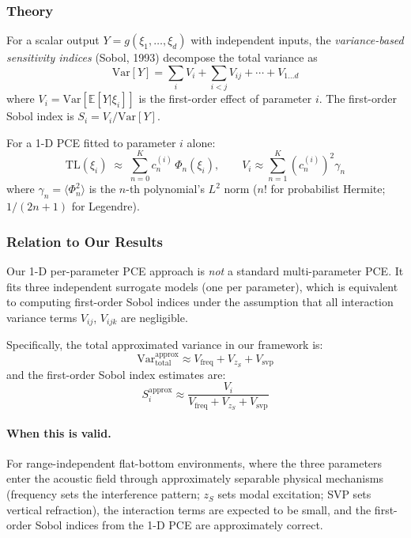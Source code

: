 \documentclass[11pt,a4paper]{article}
\newcommand{\EX}{\mathbb{E}}
\newcommand{\Var}{\mathrm{Var}}
\newcommand{\TL}{\mathrm{TL}}
\begin{document}
\subsubsection{Theory}

For a scalar output $Y = g(\xi_1,\ldots,\xi_d)$ with independent inputs, the
\emph{variance-based sensitivity indices} (Sobol, 1993) decompose the total variance as
\begin{equation}
  \Var[Y] = \sum_i V_i + \sum_{i<j} V_{ij} + \cdots + V_{1\ldots d}
\end{equation}
where $V_i = \Var[\EX[Y|\xi_i]]$ is the first-order effect of parameter $i$.
The first-order Sobol index is $S_i = V_i / \Var[Y]$.

For a 1-D PCE fitted to parameter $i$ alone:
\begin{equation}
  \TL(\xi_i) \;\approx\; \sum_{n=0}^K c_n^{(i)}\,\Phi_n(\xi_i),
  \qquad
  V_i \approx \sum_{n=1}^K \left(c_n^{(i)}\right)^2 \gamma_n
\end{equation}
where $\gamma_n = \langle\Phi_n^2\rangle$ is the $n$-th polynomial's $L^2$ norm
($n!$ for probabilist Hermite; $1/(2n+1)$ for Legendre).

\subsubsection{Relation to Our Results}

Our 1-D per-parameter PCE approach is \emph{not} a standard multi-parameter PCE.
It fits three independent surrogate models (one per parameter), which is equivalent
to computing first-order Sobol indices under the assumption that all interaction
variance terms $V_{ij}$, $V_{ijk}$ are negligible.

Specifically, the total approximated variance in our framework is:
\begin{equation}
  \Var_\text{total}^\text{approx} \approx V_\text{freq} + V_{z_S} + V_\text{svp}
\end{equation}
and the first-order Sobol index estimates are:
\begin{equation}
  S_i^\text{approx} \approx \frac{V_i}{V_\text{freq} + V_{z_S} + V_\text{svp}}
\end{equation}

\paragraph{When this is valid.}
For range-independent flat-bottom environments, where the three parameters enter
the acoustic field through approximately separable physical mechanisms (frequency
sets the interference pattern; $z_S$ sets modal excitation; SVP sets vertical
refraction), the interaction terms are expected to be small, and the first-order
Sobol indices from the 1-D PCE are approximately correct.
\end{document}
